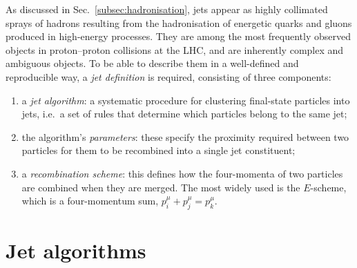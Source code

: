 As discussed in Sec.~\ref{subsec:hadronisation}, jets
appear as highly collimated sprays of hadrons resulting
from the hadronisation of energetic quarks and gluons produced in
high-energy processes. They are among the most frequently
observed objects in proton--proton collisions at the LHC, and
are inherently complex and ambiguous objects. To be able to describe them in a
well-defined and reproducible way, a \emph{jet definition} is required, 
consisting of three components:
\begin{enumerate}
    \item a \emph{jet algorithm}: a systematic procedure for clustering 
    final-state particles into jets, i.e.\ a set of rules that determine 
    which particles belong to the same jet;
    
    \item the algorithm's \emph{parameters}: these specify the proximity required between two particles for them to be recombined into a single jet constituent;
    
\item a \emph{recombination scheme}: this defines how the four-momenta of two particles are combined when they are merged. The most widely used is the $E$-scheme, which is a four-momentum sum, $p_i^\mu + p_j^\mu = p_k^\mu$.
\end{enumerate}

\section{Jet algorithms}
\label{sec:jet-algs}

